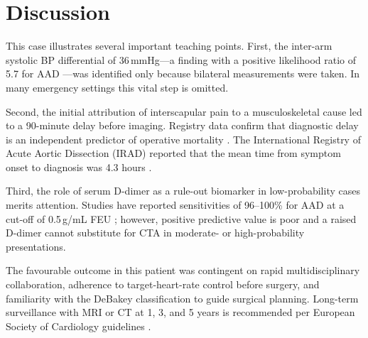 \section{Discussion}

This case illustrates several important teaching points. First, the inter-arm systolic BP
differential of 36\,mmHg—a finding with a positive likelihood ratio of 5.7 for AAD
\cite{klompas2002}—was identified only because bilateral measurements were taken. In many
emergency settings this vital step is omitted.

Second, the initial attribution of interscapular pain to a musculoskeletal cause led to a
90-minute delay before imaging. Registry data confirm that diagnostic delay is an independent
predictor of operative mortality \cite{rampoldi2007}. The International Registry of Acute
Aortic Dissection (IRAD) reported that the mean time from symptom onset to diagnosis was
4.3 hours \cite{bossone2018}.

Third, the role of serum D-dimer as a rule-out biomarker in low-probability cases merits
attention. Studies have reported sensitivities of 96--100\% for AAD at a cut-off of
0.5\,\textmu g/mL FEU \cite{suzuki2009}; however, positive predictive value is poor and a
raised D-dimer cannot substitute for CTA in moderate- or high-probability presentations.

The favourable outcome in this patient was contingent on rapid multidisciplinary collaboration,
adherence to target-heart-rate control before surgery, and familiarity with the DeBakey
classification to guide surgical planning. Long-term surveillance with MRI or CT at 1, 3, and
5 years is recommended per European Society of Cardiology guidelines \cite{erbel2014}.

